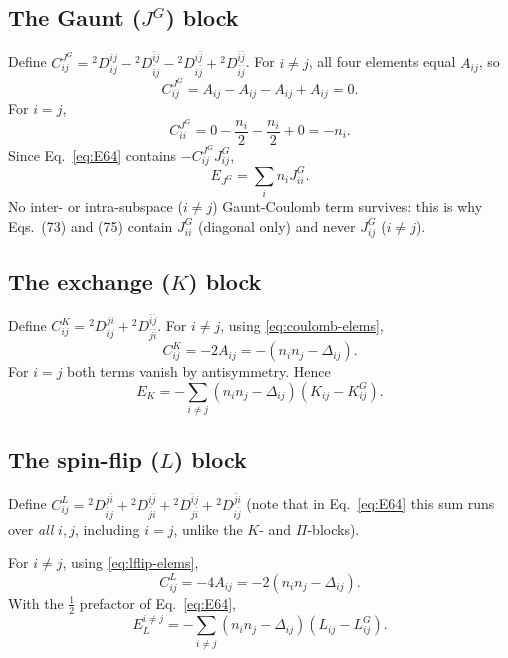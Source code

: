 \documentclass[11pt,a4paper]{article}
\newcommand{\Dtwo}{{}^2D}
\newcommand{\PiMat}{\Pi}
\newcommand{\DeltaMat}{\Delta}
\begin{document}
\subsection{The Gaunt ($J^G$) block}
Define $C^{J^G}_{ij}=\Dtwo^{ij}_{ij}-\Dtwo^{\bar ij}_{\bar ij}-\Dtwo^{i\bar j}_{i\bar j}+\Dtwo^{\bar i\bar j}_{\bar i\bar j}$.
For $i\neq j$, all four elements equal $A_{ij}$, so
\begin{equation}
C^{J^G}_{ij}=A_{ij}-A_{ij}-A_{ij}+A_{ij}=0.
\end{equation}
For $i=j$,
\begin{equation}
C^{J^G}_{ii}=0-\frac{n_i}{2}-\frac{n_i}{2}+0=-n_i .
\end{equation}
Since Eq.~\eqref{eq:E64} contains $-C^{J^G}_{ij}J^G_{ij}$,
\begin{equation}
E_{J^G}=\sum_i n_iJ^G_{ii}.
\label{eq:EJG}
\end{equation}
No inter- or intra-subspace ($i\neq j$) Gaunt-Coulomb term survives:
this is why Eqs.~(73) and (75) contain $J^G_{ii}$ (diagonal only) and
never $J^G_{ij}$ ($i\ne j$).

\subsection{The exchange ($K$) block}
Define $C^K_{ij}=\Dtwo^{ji}_{ij}+\Dtwo^{\bar i\bar j}_{\bar j\bar i}$.
For $i\neq j$, using \eqref{eq:coulomb-elems},
\begin{equation}
C^K_{ij}=-2A_{ij}=-(n_in_j-\DeltaMat_{ij}).
\label{eq:CK}
\end{equation}
For $i=j$ both terms vanish by antisymmetry. Hence
\begin{equation}
E_K=-\sum_{i\neq j}(n_in_j-\DeltaMat_{ij})(K_{ij}-K^G_{ij}).
\label{eq:EK}
\end{equation}

\subsection{The spin-flip ($L$) block}
Define $C^L_{ij}=\Dtwo^{j\bar i}_{\bar ij}+\Dtwo^{i\bar j}_{\bar ji}+\Dtwo^{\bar ij}_{j\bar i}+\Dtwo^{\bar ji}_{i\bar j}$
(note that in Eq.~\eqref{eq:E64} this sum runs over \emph{all} $i,j$,
including $i=j$, unlike the $K$- and $\PiMat$-blocks).

For $i\neq j$, using \eqref{eq:lflip-elems},
\begin{equation}
C^L_{ij}=-4A_{ij}=-2(n_in_j-\DeltaMat_{ij}) .
\end{equation}
With the $\tfrac12$ prefactor of Eq.~\eqref{eq:E64},
\begin{equation}
E_L^{i\neq j}=-\sum_{i\neq j}(n_in_j-\DeltaMat_{ij})(L_{ij}-L^G_{ij}).
\label{eq:EL-offdiag}
\end{equation}
\end{document}
